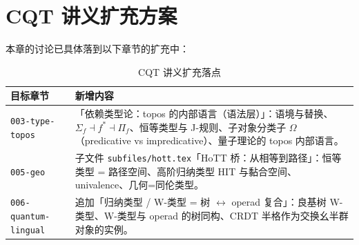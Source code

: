 \documentclass[10pt, openany]{book}
\begin{document}
\chapter{CQT 讲义扩充方案}

本章的讨论已具体落到以下章节的扩充中：

\begin{table}[h]
\centering
\begin{tabular}{|p{3.5cm}|p{9.5cm}|}
\hline
\textbf{目标章节} & \textbf{新增内容} \\
\hline
\texttt{003-type-topos} & 「依赖类型论：topos 的内部语言（语法层）」：语境与替换、$\Sigma_f\dashv f^{*}\dashv\Pi_f$、恒等类型与 J-规则、子对象分类子 $\Omega$（predicative vs impredicative）、量子理论的 topos 内部语言。 \\
\hline
\texttt{005-geo} & 子文件 \texttt{subfiles/hott.tex}「HoTT 桥：从相等到路径」：恒等类型 = 路径空间、高阶归纳类型 HIT 与黏合空间、univalence、几何=同伦类型。 \\
\hline
\texttt{006-quantum-lingual} & 追加「归纳类型 / W-类型 = 树 $\leftrightarrow$ operad 复合」：良基树 W-类型、W-类型与 operad 的树同构、CRDT 半格作为交换幺半群对象的实例。 \\
\hline
\end{tabular}
\caption{CQT 讲义扩充落点}
\end{table}

\printbibliography
\end{document}
